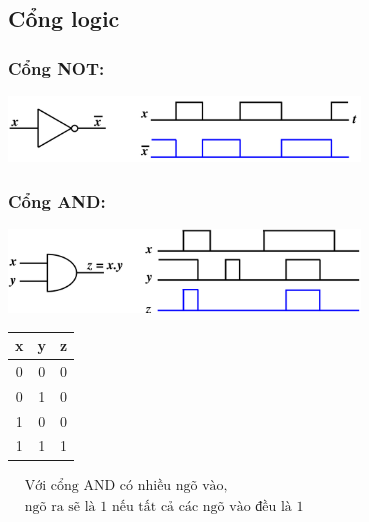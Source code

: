 \subsection{Cổng logic}
\subsubsection{Cổng NOT:}
\begin{center}
    \includegraphics[width = 0.7\textwidth]{./local/image/20.png}
\end{center}
\subsubsection{Cổng AND:}
\begin{center}
    \includegraphics[width = 0.7\textwidth]{./local/image/21.png}
\end{center}
\begin{table}[h!]
    \centering
    \begin{tabular}{|cc|c|}
    \hline
    \textbf{x} & \textbf{y} & \textbf{z} \\ \hline
    0          & 0          & 0                      \\ 
    0          & 1          & 0                      \\ 
    1          & 0          & 0                      \\ 
    1          & 1          & 1                      \\ \hline
    \end{tabular} \qquad 
    $\begin{aligned}
        &\text{Với cổng AND có nhiều ngõ vào,}\\
        &\text{ngõ ra sẽ là 1 nếu tất cả các ngõ vào đều là 1}
    \end{aligned}$
\end{table}
